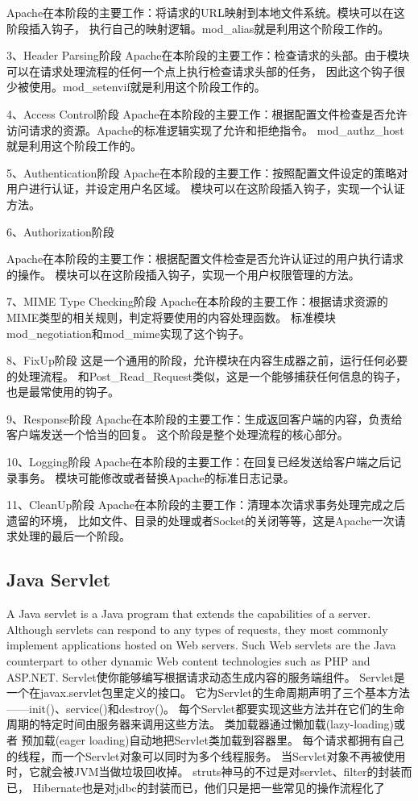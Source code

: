 \documentclass{book}
\begin{document}
Apache在本阶段的主要工作：将请求的URL映射到本地文件系统。模块可以在这阶段插入钩子，
执行自己的映射逻辑。mod\_alias就是利用这个阶段工作的。

3、Header Parsing阶段
Apache在本阶段的主要工作：检查请求的头部。由于模块可以在请求处理流程的任何一个点上执行检查请求头部的任务，
因此这个钩子很少被使用。mod\_setenvif就是利用这个阶段工作的。

4、Access Control阶段 
Apache在本阶段的主要工作：根据配置文件检查是否允许访问请求的资源。Apache的标准逻辑实现了允许和拒绝指令。
mod\_authz\_host就是利用这个阶段工作的。

5、Authentication阶段
Apache在本阶段的主要工作：按照配置文件设定的策略对用户进行认证，并设定用户名区域。
模块可以在这阶段插入钩子，实现一个认证方法。

6、Authorization阶段 

Apache在本阶段的主要工作：根据配置文件检查是否允许认证过的用户执行请求的操作。
模块可以在这阶段插入钩子，实现一个用户权限管理的方法。

7、MIME Type Checking阶段
Apache在本阶段的主要工作：根据请求资源的MIME类型的相关规则，判定将要使用的内容处理函数。
标准模块mod\_negotiation和mod\_mime实现了这个钩子。

8、FixUp阶段 
这是一个通用的阶段，允许模块在内容生成器之前，运行任何必要的处理流程。
和Post\_Read\_Request类似，这是一个能够捕获任何信息的钩子，也是最常使用的钩子。

9、Response阶段 
Apache在本阶段的主要工作：生成返回客户端的内容，负责给客户端发送一个恰当的回复。
这个阶段是整个处理流程的核心部分。

10、Logging阶段 
Apache在本阶段的主要工作：在回复已经发送给客户端之后记录事务。
模块可能修改或者替换Apache的标准日志记录。

11、CleanUp阶段 
Apache在本阶段的主要工作：清理本次请求事务处理完成之后遗留的环境，
比如文件、目录的处理或者Socket的关闭等等，这是Apache一次请求处理的最后一个阶段。

\subsection{Java Servlet}

A Java servlet is a Java program that extends the capabilities of a server. 
Although servlets can respond to any types of requests, 
they most commonly implement applications hosted on Web servers. 
Such Web servlets are the Java counterpart to other 
dynamic Web content technologies such as PHP and ASP.NET.
Servlet使你能够编写根据请求动态生成内容的服务端组件。
Servlet是一个在javax.servlet包里定义的接口。
它为Servlet的生命周期声明了三个基本方法——init()、service()和destroy()。
每个Servlet都要实现这些方法并在它们的生命周期的特定时间由服务器来调用这些方法。
类加载器通过懒加载(lazy-loading)或者
预加载(eager loading)自动地把Servlet类加载到容器里。
每个请求都拥有自己的线程，而一个Servlet对象可以同时为多个线程服务。
当Servlet对象不再被使用时，它就会被JVM当做垃圾回收掉。
struts神马的不过是对servlet、filter的封装而已，
Hibernate也是对jdbc的封装而已，他们只是把一些常见的操作流程化了
\end{document}

